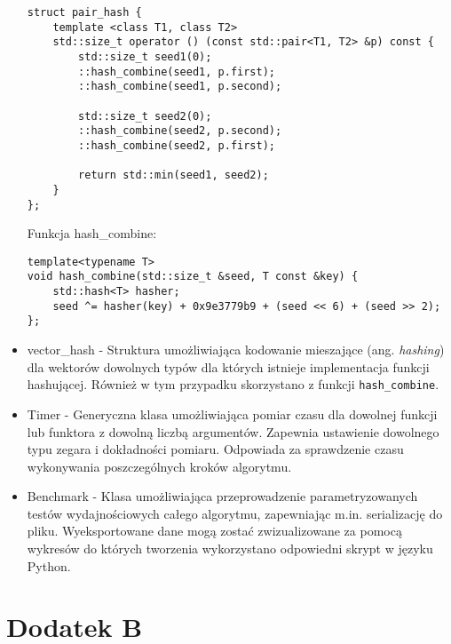 \documentclass[12pt]{article}
\begin{document}
\begin{itemize}
\begin{lstlisting}
struct pair_hash {
	template <class T1, class T2>
	std::size_t operator () (const std::pair<T1, T2> &p) const {
		std::size_t seed1(0);
		::hash_combine(seed1, p.first);
		::hash_combine(seed1, p.second);

		std::size_t seed2(0);
		::hash_combine(seed2, p.second);
		::hash_combine(seed2, p.first);

		return std::min(seed1, seed2);
	}
};
\end{lstlisting}

Funkcja hash\_combine:
\begin{lstlisting}
template<typename T>
void hash_combine(std::size_t &seed, T const &key) {
	std::hash<T> hasher;
	seed ^= hasher(key) + 0x9e3779b9 + (seed << 6) + (seed >> 2);
};
\end{lstlisting}

\item vector\_hash - Struktura umożliwiająca kodowanie mieszające (ang. \textit{hashing}) dla wektorów dowolnych typów dla których istnieje implementacja funkcji hashującej. Również w tym przypadku skorzystano z funkcji \lstinline{hash_combine}.

\item Timer - Generyczna klasa umożliwiająca pomiar czasu dla dowolnej funkcji lub funktora z dowolną liczbą argumentów. Zapewnia ustawienie dowolnego typu zegara i dokładności pomiaru. Odpowiada za sprawdzenie czasu wykonywania poszczególnych kroków algorytmu.

\item Benchmark - Klasa umożliwiająca przeprowadzenie parametryzowanych testów wydajnościowych całego algorytmu, zapewniając m.in. serializację do pliku. Wyeksportowane dane mogą zostać zwizualizowane za pomocą wykresów do których tworzenia wykorzystano odpowiedni skrypt w języku Python.

\end{itemize}

\section{Dodatek B}
\end{document}
